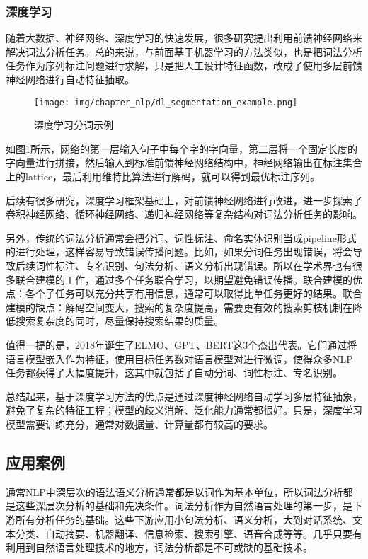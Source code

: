 \subsubsection{深度学习}
随着大数据、神经网络、深度学习的快速发展，很多研究提出利用前馈神经网络来解决词法分析\cite{collobert2011natural}\cite{zheng2013deep}任务。总的来说，与前面基于机器学习的方法类似，也是把词法分析任务作为序列标注问题进行求解，只是把人工设计特征函数，改成了使用多层前馈神经网络进行自动特征抽取。

\begin{figure}[h!]
\centering
\texttt{[image: img/chapter\_nlp/dl\_segmentation\_example.png]}
\caption{深度学习分词示例}
\label{fig:dl_segmentation_example}
\end{figure}

如图\ref{fig:dl_segmentation_example}所示，网络的第一层输入句子中每个字的字向量，第二层将一个固定长度的字向量进行拼接，然后输入到标准前馈神经网络结构中，神经网络输出在标注集合上的lattice，最后利用维特比算法进行解码，就可以得到最优标注序列。

后续有很多研究，深度学习框架基础上，对前馈神经网络进行改进，进一步探索了卷积神经网络\cite{wu2019neural}、循环神经网络\cite{chen2015long}、递归神经网络\cite{chen2015gated}等复杂结构对词法分析任务的影响。

另外，传统的词法分析通常会把分词、词性标注、命名实体识别当成pipeline形式的进行处理，这样容易导致错误传播问题。比如，如果分词任务出现错误，将会导致后续词性标注、专名识别、句法分析、语义分析出现错误。所以在学术界也有很多联合建模\cite{zhang2008joint}\cite{hatori2012incremental}\cite{shao2017character}的工作，通过多个任务联合学习，以期望避免错误传播。联合建模的优点：各个子任务可以充分共享有用信息，通常可以取得比单任务更好的结果。联合建模的缺点：解码空间变大，搜索的复杂度提高，需要更有效的搜索剪枝机制在降低搜索复杂度的同时，尽量保持搜索结果的质量。

值得一提的是，2018年诞生了ELMO\cite{peters2018deep}、GPT\cite{radford2018improving}、BERT\cite{devlin2018bert}这3个杰出代表。它们通过将语言模型嵌入作为特征，使用目标任务数对语言模型对进行微调，使得众多NLP任务都获得了大幅度提升，这其中就包括了自动分词、词性标注、专名识别。

总结起来，基于深度学习方法的优点是通过深度神经网络自动学习多层特征抽象，避免了复杂的特征工程；模型的歧义消解、泛化能力通常都很好。只是，深度学习模型需要训练充分，通常对数据量、计算量都有较高的要求。

\subsection{应用案例}
通常NLP中深层次的语法语义分析通常都是以词作为基本单位，所以词法分析都是这些深层次分析的基础和先决条件。词法分析作为自然语言处理的第一步，是下游所有分析任务的基础。这些下游应用小句法分析、语义分析，大到对话系统、文本分类、自动摘要、机器翻译\cite{chang2008optimizing}、信息检索、搜索引擎、语音合成等等。几乎只要有利用到自然语言处理技术的地方，词法分析都是不可或缺的基础技术。

